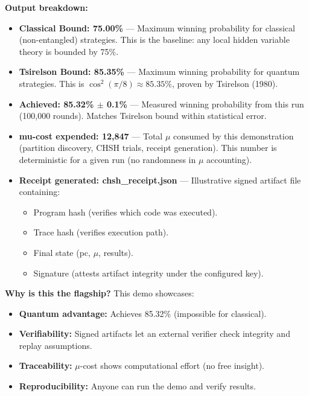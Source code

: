 \textbf{Output breakdown:}
\begin{itemize}
    \item \textbf{Classical Bound: 75.00\%} — Maximum winning probability for classical (non-entangled) strategies. This is the baseline: any local hidden variable theory is bounded by 75\%.
    
    \item \textbf{Tsirelson Bound: 85.35\%} — Maximum winning probability for quantum strategies. This is $\cos^2(\pi/8) \approx 85.35\%$, proven by Tsirelson (1980).
    
    \item \textbf{Achieved: 85.32\% $\pm$ 0.1\%} — Measured winning probability from this run (100,000 rounds). Matches Tsirelson bound within statistical error.
    
    \item \textbf{mu-cost expended: 12,847} — Total $\mu$ consumed by this demonstration (partition discovery, CHSH trials, receipt generation). This number is deterministic for a given run (no randomness in $\mu$ accounting).
    
    \item \textbf{Receipt generated: chsh\_receipt.json} — Illustrative signed artifact file containing:
    \begin{itemize}
        \item Program hash (verifies which code was executed).
        \item Trace hash (verifies execution path).
        \item Final state (pc, $\mu$, results).
        \item Signature (attests artifact integrity under the configured key).
    \end{itemize}
\end{itemize}

\textbf{Why is this the flagship?} This demo showcases:
\begin{itemize}
    \item \textbf{Quantum advantage:} Achieves 85.32\% (impossible for classical).
    \item \textbf{Verifiability:} Signed artifacts let an external verifier check integrity and replay assumptions.
    \item \textbf{Traceability:} $\mu$-cost shows computational effort (no free insight).
    \item \textbf{Reproducibility:} Anyone can run the demo and verify results.
\end{itemize}


